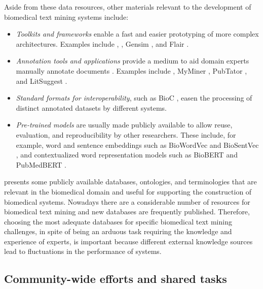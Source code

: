Aside from these data resources, other materials relevant to the development of biomedical text mining systems include:



\begin{itemize}

\item
\textit{Toolkits and frameworks} enable a fast and easier prototyping of more complex  architectures.
Examples include  \parencite{loper2002a},  \parencite{savova2010a}, Gensim \parencite{rehurek2010a}, and Flair \parencite{akbik2019a}.

\item
\textit{Annotation tools and applications} provide a medium to aid domain experts manually annotate documents \parencite{neves2021a}.
Examples include  \parencite{stenetorp2012a}, MyMiner \parencite{salgado2012a}, PubTator \parencite{wei2013b}, and LitSuggest \parencite{allot2021a}.

\item
\textit{Standard formats for interoperability}, such as BioC \parencite{comeau2013a}, easen the processing of distinct annotated datasets by different  systems.

\item
\textit{Pre-trained models} are usually made publicly available to allow reuse, evaluation, and reproducibility by other researchers.
These include, for example, word and sentence embeddings such as BioWordVec \parencite{zhang2019c} and BioSentVec \parencite{chen2019g}, and contextualized word representation models such as BioBERT \parencite{lee2020a} and PubMedBERT \parencite{gu2021a}.

\end{itemize}

 presents some publicly available databases, ontologies, and terminologies that are relevant in the biomedical domain and useful for supporting the construction of biomedical  systems.
Nowadays there are a considerable number of resources for biomedical text mining and  new databases are frequently published.
Therefore, choosing the most adequate databases for specific biomedical text mining challenges, in spite of being an arduous task requiring the knowledge and experience of experts, is important because different external knowledge sources lead to fluctuations in the performance of  systems.


\subsection{Community-wide efforts and shared tasks}

